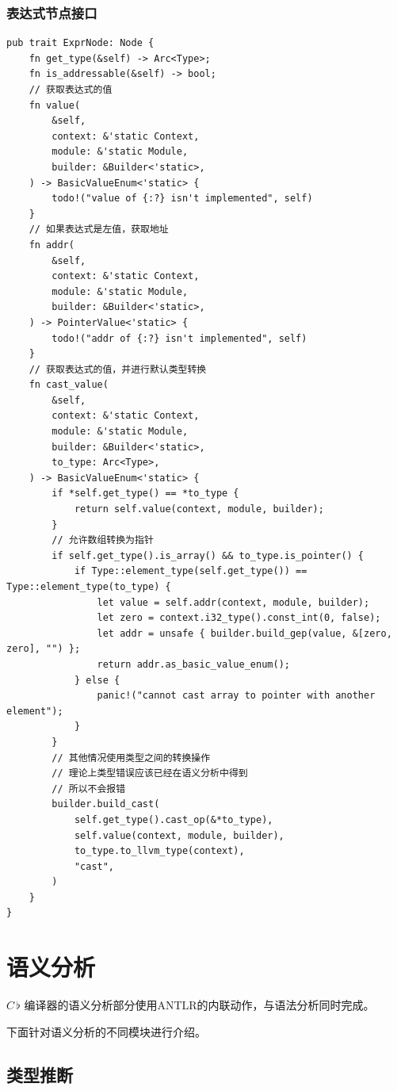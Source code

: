 \documentclass{ctexrep}
\newcommand{\cb}{$C\,\flat$\xspace}
\begin{document}
\subsubsection{表达式节点接口}
\begin{verbatim}
pub trait ExprNode: Node {
    fn get_type(&self) -> Arc<Type>;
    fn is_addressable(&self) -> bool;
    // 获取表达式的值
    fn value(
        &self,
        context: &'static Context,
        module: &'static Module,
        builder: &Builder<'static>,
    ) -> BasicValueEnum<'static> {
        todo!("value of {:?} isn't implemented", self)
    }
    // 如果表达式是左值，获取地址
    fn addr(
        &self,
        context: &'static Context,
        module: &'static Module,
        builder: &Builder<'static>,
    ) -> PointerValue<'static> {
        todo!("addr of {:?} isn't implemented", self)
    }
    // 获取表达式的值，并进行默认类型转换
    fn cast_value(
        &self,
        context: &'static Context,
        module: &'static Module,
        builder: &Builder<'static>,
        to_type: Arc<Type>,
    ) -> BasicValueEnum<'static> {
        if *self.get_type() == *to_type {
            return self.value(context, module, builder);
        }
        // 允许数组转换为指针
        if self.get_type().is_array() && to_type.is_pointer() {
            if Type::element_type(self.get_type()) == Type::element_type(to_type) {
                let value = self.addr(context, module, builder);
                let zero = context.i32_type().const_int(0, false);
                let addr = unsafe { builder.build_gep(value, &[zero, zero], "") };
                return addr.as_basic_value_enum();
            } else {
                panic!("cannot cast array to pointer with another element");
            }
        }
        // 其他情况使用类型之间的转换操作
        // 理论上类型错误应该已经在语义分析中得到
        // 所以不会报错
        builder.build_cast(
            self.get_type().cast_op(&*to_type),
            self.value(context, module, builder),
            to_type.to_llvm_type(context),
            "cast",
        )
    }
}
\end{verbatim}
\section{语义分析}
\cb 编译器的语义分析部分使用ANTLR的内联动作，与语法分析同时完成。

下面针对语义分析的不同模块进行介绍。
\subsection{类型推断}
\end{document}

